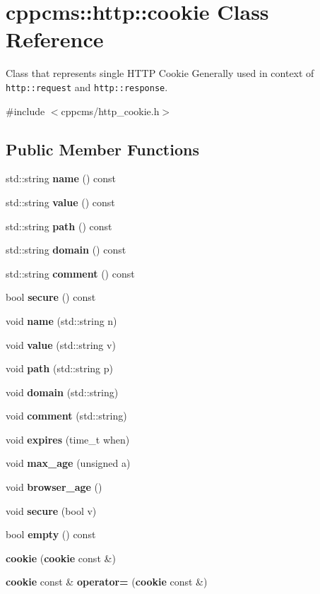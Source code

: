 \section{cppcms\-:\-:http\-:\-:cookie Class Reference}
\label{classcppcms_1_1http_1_1cookie}


Class that represents single H\-T\-T\-P Cookie Generally used in context of {\tt http\-::request} and {\tt http\-::response}.  




{\ttfamily \#include $<$cppcms/http\-\_\-cookie.\-h$>$}

\subsection*{Public Member Functions}
\begin{DoxyCompactItemize}
\item 
std\-::string {\bf name} () const 
\item 
std\-::string {\bf value} () const 
\item 
std\-::string {\bf path} () const 
\item 
std\-::string {\bf domain} () const 
\item 
std\-::string {\bf comment} () const 
\item 
bool {\bf secure} () const 
\item 
void {\bf name} (std\-::string n)
\item 
void {\bf value} (std\-::string v)
\item 
void {\bf path} (std\-::string p)
\item 
void {\bf domain} (std\-::string)
\item 
void {\bf comment} (std\-::string)
\item 
void {\bf expires} (time\-\_\-t when)
\item 
void {\bf max\-\_\-age} (unsigned a)
\item 
void {\bf browser\-\_\-age} ()
\item 
void {\bf secure} (bool v)
\item 
bool {\bf empty} () const 
\item 
{\bfseries cookie} ({\bf cookie} const \&)\label{classcppcms_1_1http_1_1cookie_a499a6443b52d30660481f06242907739}

\item 
{\bf cookie} const \& {\bfseries operator=} ({\bf cookie} const \&)\label{classcppcms_1_1http_1_1cookie_a14d9c1764f457f432532e288d41265ce}


\end{DoxyCompactItemize}
